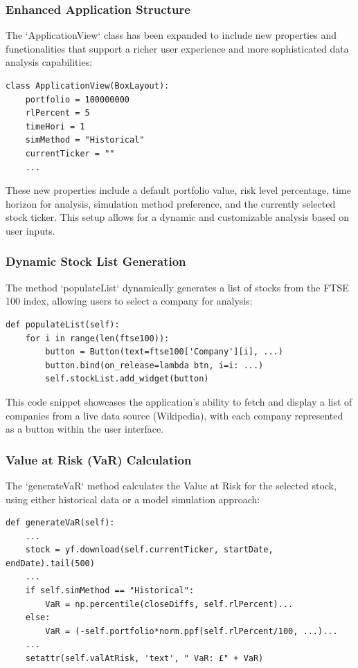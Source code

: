 \documentclass{article}
\begin{document}
\subsubsection{Enhanced Application Structure}
The `ApplicationView` class has been expanded to include new properties and functionalities that support a richer user experience and more sophisticated data analysis capabilities:

\begin{verbatim}
class ApplicationView(BoxLayout):
    portfolio = 100000000
    rlPercent = 5
    timeHori = 1
    simMethod = "Historical"
    currentTicker = ""
    ...
\end{verbatim}

These new properties include a default portfolio value, risk level percentage, time horizon for analysis, simulation method preference, and the currently selected stock ticker. This setup allows for a dynamic and customizable analysis based on user inputs.

\subsubsection{Dynamic Stock List Generation}
The method `populateList` dynamically generates a list of stocks from the FTSE 100 index, allowing users to select a company for analysis:

\begin{verbatim}
def populateList(self):
    for i in range(len(ftse100)):
        button = Button(text=ftse100['Company'][i], ...)
        button.bind(on_release=lambda btn, i=i: ...)
        self.stockList.add_widget(button)
\end{verbatim}

This code snippet showcases the application's ability to fetch and display a list of companies from a live data source (Wikipedia), with each company represented as a button within the user interface.

\subsubsection{Value at Risk (VaR) Calculation}
The `generateVaR` method calculates the Value at Risk for the selected stock, using either historical data or a model simulation approach:

\begin{verbatim}
def generateVaR(self):
    ...
    stock = yf.download(self.currentTicker, startDate, endDate).tail(500)
    ...
    if self.simMethod == "Historical":
        VaR = np.percentile(closeDiffs, self.rlPercent)...
    else:
        VaR = (-self.portfolio*norm.ppf(self.rlPercent/100, ...)...
    ...
    setattr(self.valAtRisk, 'text', " VaR: £" + VaR)
\end{verbatim}
\end{document}
